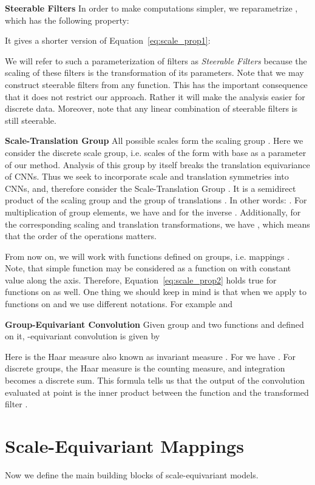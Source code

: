 \documentclass{article} \usepackage{multirow}
\def\Eqref#1{Equation~\ref{#1}}
\begin{document}
\textbf{Steerable Filters}
In order to make computations simpler, we reparametrize 
, which has the following property:


It gives a shorter version of \Eqref{eq:scale_prop1}:


We will refer to such a parameterization of filters as \textit{Steerable Filters} because
the scaling of these filters is the transformation of its parameters. Note that 
we may construct steerable filters from any function. This has the important consequence 
that it does not restrict our approach. Rather it will make 
the analysis easier for discrete data.
Moreover, note that any linear combination of steerable filters is still steerable.


\textbf{Scale-Translation Group}
All possible scales form the scaling group . Here we consider the discrete scale group, i.e.
scales of the form  with base  as a parameter of our method.
Analysis of this group by itself breaks the translation equivariance of CNNs. 
Thus we seek to incorporate scale and translation symmetries into CNNs, 
and, therefore consider the Scale-Translation Group . It is a semidirect product
of the scaling group  and the group of translations . In other words:
. 
For multiplication of group elements, we have
 and for the inverse 
. 
Additionally, for the corresponding scaling and translation transformations, we have
,
which means that the order of the operations matters.

From now on, we will work with functions defined on groups, i.e. mappings .
Note, that simple function  may be considered as  
a function on  with constant value along the  axis. Therefore, \Eqref{eq:scale_prop2} holds true 
for functions on  as well. One thing we should keep in mind is that when we apply  
to functions on  and  we use different notations. For example
 and 


\textbf{Group-Equivariant Convolution}
Given group  and two functions  and  defined on it, 
-equivariant convolution is given by

Here  is the Haar measure also known as invariant measure \citet{folland2016course}. For 
 we have .
For discrete groups, the Haar measure is the counting measure, and integration becomes a discrete sum.
This formula tells us that the output of the convolution evaluated at point  is 
the inner product between the function  and the transformed filter .


 \section{Scale-Equivariant Mappings}
\label{sec:ses_conv}
Now we define the main building blocks 
of scale-equivariant models. 
\end{document}
